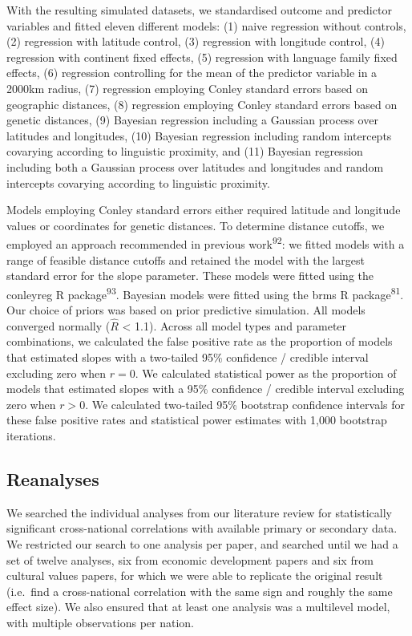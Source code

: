\documentclass[
  man,floatsintext]{apa6}
\begin{document}
With the resulting simulated datasets, we standardised outcome and predictor variables and fitted eleven different models: (1) naive regression without controls, (2) regression with latitude control, (3) regression with longitude control, (4) regression with continent fixed effects, (5) regression with language family fixed effects, (6) regression controlling for the mean of the predictor variable in a 2000km radius, (7) regression employing Conley standard errors based on geographic distances, (8) regression employing Conley standard errors based on genetic distances, (9) Bayesian regression including a Gaussian process over latitudes and longitudes, (10) Bayesian regression including random intercepts covarying according to linguistic proximity, and (11) Bayesian regression including both a Gaussian process over latitudes and longitudes and random intercepts covarying according to linguistic proximity.

Models employing Conley standard errors either required latitude and longitude values or coordinates for genetic distances. To determine distance cutoffs, we employed an approach recommended in previous work\textsuperscript{92}: we fitted models with a range of feasible distance cutoffs and retained the model with the largest standard error for the slope parameter. These models were fitted using the conleyreg R package\textsuperscript{93}. Bayesian models were fitted using the brms R package\textsuperscript{81}. Our choice of priors was based on prior predictive simulation. All models converged normally (\(\hat{R}\) \textless{} 1.1). Across all model types and parameter combinations, we calculated the false positive rate as the proportion of models that estimated slopes with a two-tailed 95\% confidence / credible interval excluding zero when \(r = 0\). We calculated statistical power as the proportion of models that estimated slopes with a 95\% confidence / credible interval excluding zero when \(r > 0\). We calculated two-tailed 95\% bootstrap confidence intervals for these false positive rates and statistical power estimates with 1,000 bootstrap iterations.

\hypertarget{reanalyses}{%
\subsection{Reanalyses}\label{reanalyses}}

We searched the individual analyses from our literature review for statistically significant cross-national correlations with available primary or secondary data. We restricted our search to one analysis per paper, and searched until we had a set of twelve analyses, six from economic development papers and six from cultural values papers, for which we were able to replicate the original result (i.e.~find a cross-national correlation with the same sign and roughly the same effect size). We also ensured that at least one analysis was a multilevel model, with multiple observations per nation.
\end{document}
